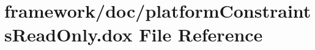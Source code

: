 \hypertarget{platform_constraints_read_only_8dox}{}\section{framework/doc/platform\+Constraints\+Read\+Only.dox File Reference}
\label{platform_constraints_read_only_8dox}
